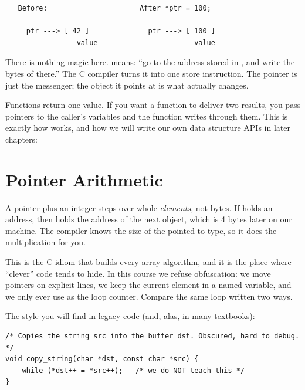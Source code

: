 \begin{verbatim}
   Before:                      After *ptr = 100;

     ptr ---> [ 42 ]              ptr ---> [ 100 ]
                 value                       value
\end{verbatim}

There is nothing magic here.  means: ``go to the
address stored in , and write the bytes of  there.''
The C compiler turns it into one store instruction. The pointer is just
the messenger; the object it points at is what actually changes.

\begin{insight}
Functions return one value. If you want a function to deliver two
results, you pass pointers to the caller's variables and the function
writes through them. This is exactly how  works, and how
we will write our own data structure APIs in later chapters:
\end{insight}

\section{Pointer Arithmetic}

A pointer plus an integer steps over whole \emph{elements}, not bytes.
If  holds an address, then  holds the address
of the next  object, which is 4 bytes later on our machine.
The compiler knows the size of the pointed-to type, so it does the
multiplication for you.

This is the C idiom that builds every array algorithm, and it is the
place where ``clever'' code tends to hide. In this course we refuse
obfuscation: we move pointers on explicit lines, we keep the current
element in a named variable, and we only ever use  as the
loop counter. Compare the same loop written two ways.

The style you will find in legacy code (and, alas, in many textbooks):

\begin{lstlisting}[caption={Legacy style -- compact, but opaque.}]
/* Copies the string src into the buffer dst. Obscured, hard to debug. */
void copy_string(char *dst, const char *src) {
    while (*dst++ = *src++);   /* we do NOT teach this */
}
\end{lstlisting}

